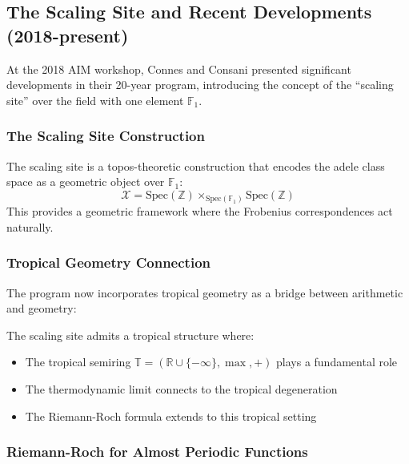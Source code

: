 \subsection{The Scaling Site and Recent Developments (2018-present)}

At the 2018 AIM workshop, Connes and Consani presented significant developments in their 20-year program, introducing the concept of the ``scaling site'' over the field with one element $\mathbb{F}_1$.

\subsubsection{The Scaling Site Construction}

\begin{definition}
\label{def:scaling_site}
The scaling site is a topos-theoretic construction that encodes the adele class space as a geometric object over $\mathbb{F}_1$:
\begin{equation}
\mathcal{X} = \text{Spec}(\mathbb{Z}) \times_{\text{Spec}(\mathbb{F}_1)} \text{Spec}(\mathbb{Z})
\end{equation}
This provides a geometric framework where the Frobenius correspondences act naturally.
\end{definition}

\subsubsection{Tropical Geometry Connection}

The program now incorporates tropical geometry as a bridge between arithmetic and geometry:

\begin{theorem}
\label{thm:tropical_structure}
The scaling site admits a tropical structure where:
\begin{itemize}
\item The tropical semiring $\mathbb{T} = (\mathbb{R} \cup \{-\infty\}, \max, +)$ plays a fundamental role
\item The thermodynamic limit connects to the tropical degeneration
\item The Riemann-Roch formula extends to this tropical setting
\end{itemize}
\end{theorem}

\subsubsection{Riemann-Roch for Almost Periodic Functions}

